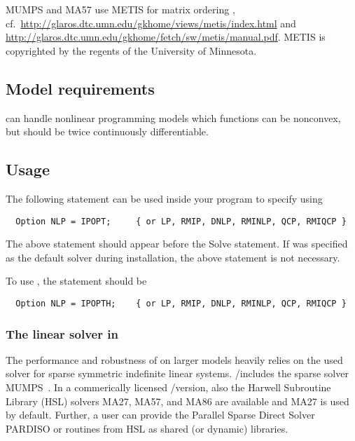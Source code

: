 \textsc{MUMPS} and \textsc{MA57} use \textsc{METIS} for matrix ordering \cite{KaKu99}, cf.~\url{http://glaros.dtc.umn.edu/gkhome/views/metis/index.html} and \url{http://glaros.dtc.umn.edu/gkhome/fetch/sw/metis/manual.pdf}.
\textsc{METIS} is copyrighted by the regents of the University of Minnesota.

\subsection{Model requirements}

\IPOPT can handle nonlinear programming models which functions can be nonconvex, but should be twice continuously differentiable.

\subsection{Usage}

The following statement can be used inside your \GAMS program to specify using \IPOPT
\begin{verbatim}
  Option NLP = IPOPT;     { or LP, RMIP, DNLP, RMINLP, QCP, RMIQCP }
\end{verbatim}

The above statement should appear before the Solve statement.
If \IPOPT was specified as the default solver during \GAMS installation, the above statement is not necessary.

To use \IPOPTH, the statement should be
\begin{verbatim}
  Option NLP = IPOPTH;    { or LP, RMIP, DNLP, RMINLP, QCP, RMIQCP }
\end{verbatim}

\subsubsection{The linear solver in \IPOPT}
\label{ipoptlinearsolver}
\hypertarget{ipoptlinearsolver}{}

The performance and robustness of \IPOPT on larger models heavily relies on the used solver for sparse symmetric indefinite linear systems.
\GAMS/\IPOPT includes the sparse solver MUMPS~\cite{AmestoyDuffKosterLExcellent2001,AmestoyGuermoucheLExcellentPralet2006}.
In a commerically licensed \GAMS/\IPOPTH version, also the Harwell Subroutine Library (HSL) solvers MA27, MA57, and MA86 are available and MA27 is used by default.
Further, a user can provide the Parallel Sparse Direct Solver PARDISO or routines from HSL as shared (or dynamic) libraries.

